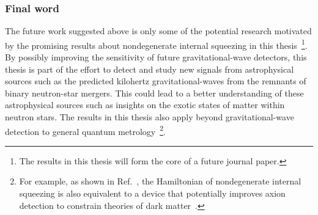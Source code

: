 \subsubsection{Final word}
The future work suggested above is only some of the potential research motivated by the promising results about nondegenerate internal squeezing in this thesis~\footnote{The results in this thesis will form the core of a future journal paper.}.
By possibly improving the sensitivity of future gravitational-wave detectors, this thesis is part of the effort to detect and study new signals from astrophysical sources such as the predicted kilohertz gravitational-waves from the remnants of binary neutron-star mergers. This could lead to a better understanding of these astrophysical sources such as insights on the exotic states of matter within neutron stars.
The results in this thesis also apply beyond gravitational-wave detection to general quantum metrology~\footnote{For example, as shown in Ref.~\cite{liBroadbandSensitivityImprovement2020}, the Hamiltonian of nondegenerate internal squeezing is also equivalent to a device that potentially improves axion detection to constrain theories of dark matter~\cite{MARSH20161,PhysRevX.9.021023}.}. %

